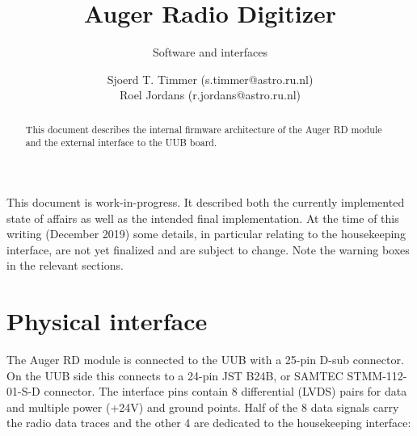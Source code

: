 \documentclass[a4paper,indent]{paper}
\title{Auger Radio Digitizer}
\subtitle{Software and interfaces}
\author{%
  Sjoerd T. Timmer (s.timmer@astro.ru.nl)\\
  Roel Jordans (r.jordans@astro.ru.nl)}
\date{}
\begin{document}
\maketitle{}
\begin{abstract}
  This document describes the internal firmware architecture of the Auger \acf{RD} module and the external interface to the \acs{UUB} board.  \acresetall
\end{abstract}

\begin{mdframed}[linewidth=2pt,linecolor=orange,backgroundcolor=orange!10]%
  This document is work-in-progress.
  It described both the currently implemented state of affairs as well as the intended final implementation.
  At the time of this writing (December 2019) some details, in particular relating to the housekeeping interface, are not yet finalized and are subject to change. Note the warning boxes in the relevant sections. 
\end{mdframed}
  
\tableofcontents

\clearpage


\section{Physical interface}
The Auger \ac{RD} module is connected to the \ac{UUB} with a 25-pin D-sub connector.
On the \ac{UUB} side this connects to a 24-pin JST B24B, or SAMTEC STMM-112-01-S-D connector.
The interface pins contain 8 differential (LVDS) pairs for data and multiple power (+24V) and ground points.
Half of the 8 data signals carry the radio data traces and the other 4 are dedicated to the housekeeping interface:%
\end{document}
